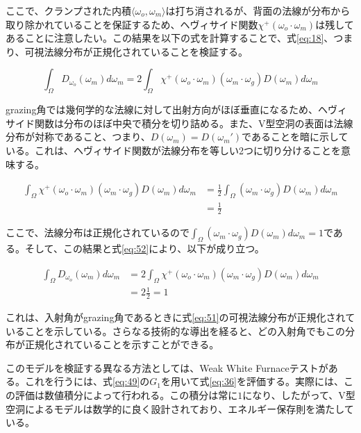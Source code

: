 \documentclass[a4j,xelatex,ja=standard]{bxjsarticle}
\begin{document}
ここで、クランプされた内積$\langle \omega_o, \omega_m \rangle$は打ち消されるが、背面の法線が分布から取り除かれていることを保証するため、ヘヴィサイド関数$\chi^+(\omega_o \cdot \omega_m)$は残してあることに注意したい。この結果を以下の式を計算することで、式\eqref{eq:18}、つまり、可視法線分布が正規化されていることを検証する。

\begin{equation}
    \int_{\Omega} D_{\omega_o}(\omega_m) d\omega_m = 2 \int_{\Omega} \chi^+(\omega_o \cdot \omega_m) (\omega_m \cdot \omega_g) D(\omega_m) d\omega_m
    \label{eq:52}
\end{equation}

grazing角では幾何学的な法線に対して出射方向がほぼ垂直になるため、ヘヴィサイド関数は分布のほぼ中央で積分を切り詰める。また、V型空洞の表面は法線分布が対称であること、つまり、$D(\omega_m) = D(\omega_m')$であることを暗に示している。これは、ヘヴィサイド関数が法線分布を等しい2つに切り分けることを意味する。

\begin{equation}
    \begin{split}
        \int_{\Omega} \chi^+(\omega_o \cdot \omega_m) (\omega_m \cdot \omega_g) D(\omega_m) d\omega_m
        &= \frac{1}{2} \int_{\Omega} (\omega_m \cdot \omega_g) D(\omega_m) d\omega_m \\
        &= \frac{1}{2}
    \end{split}
    \label{eq:53}
\end{equation}

ここで、法線分布は正規化されているので$\int_{\Omega} (\omega_m \cdot \omega_g) D(\omega_m) d\omega_m = 1$である。そして、この結果と式\eqref{eq:52}により、以下が成り立つ。

\begin{equation}
    \begin{split}
        \int_{\Omega} D_{\omega_o}(\omega_m) d\omega_m
        &= 2 \int_{\Omega} \chi^+(\omega_o \cdot \omega_m) (\omega_m \cdot \omega_g) D(\omega_m) d\omega_m \\
        &= 2 \frac{1}{2} = 1
    \end{split}
    \label{eq:54}
\end{equation}

これは、入射角がgrazing角であるときに式\eqref{eq:51}の可視法線分布が正規化されていることを示している。さらなる技術的な導出を経ると、どの入射角でもこの分布が正規化されていることを示すことができる。

このモデルを検証する異なる方法としては、Weak White Furnaceテストがある。これを行うには、式\eqref{eq:49}の$G_1$を用いて式\eqref{eq:36}を評価する。実際には、この評価は数値積分によって行われる。この積分は常に$1$になり、したがって、V型空洞によるモデルは数学的に良く設計されており、エネルギー保存則を満たしている。
\end{document}
